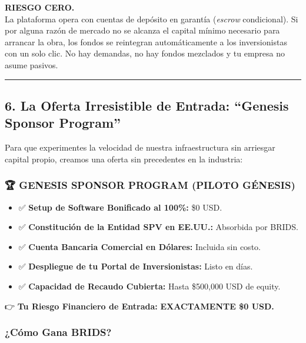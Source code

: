 \documentclass[
]{article}
\providecommand{\tightlist}{%
  \setlength{\itemsep}{0pt}\setlength{\parskip}{0pt}}
\renewenvironment{quote}{%
  \vspace{0.4em}
  \begin{tcolorbox}[
    colback=bridsLight,
    colframe=bridsBlue,
    arc=2mm,
    boxrule=1.2pt,
    left=10pt,
    right=10pt,
    top=8pt,
    bottom=8pt,
    before skip=6pt,
    after skip=8pt
  ]%
}{%
  \end{tcolorbox}%
}
\begin{document}
\begin{quote}
\textbf{RIESGO CERO.}\\
La plataforma opera con cuentas de depósito en garantía (\emph{escrow}
condicional). Si por alguna razón de mercado no se alcanza el capital
mínimo necesario para arrancar la obra, los fondos se reintegran
automáticamente a los inversionistas con un solo clic. No hay demandas,
no hay fondos mezclados y tu empresa no asume pasivos.
\end{quote}

\begin{center}\rule{0.5\linewidth}{0.5pt}\end{center}

\subsection{6. La Oferta Irresistible de Entrada: ``Genesis Sponsor
Program''}\label{la-oferta-irresistible-de-entrada-genesis-sponsor-program}

Para que experimentes la velocidad de nuestra infraestructura sin
arriesgar capital propio, creamos una oferta sin precedentes en la
industria:

\begin{quote}
\mbox{}%
\subsubsection{🏆 GENESIS SPONSOR PROGRAM (PILOTO
GÉNESIS)}\label{genesis-sponsor-program-piloto-guxe9nesis}

\begin{itemize}
\tightlist
\item
  ✅ \textbf{Setup de Software Bonificado al 100\%:} \$0 USD.
\item
  ✅ \textbf{Constitución de la Entidad SPV en EE.UU.:} Absorbida por
  BRIDS.
\item
  ✅ \textbf{Cuenta Bancaria Comercial en Dólares:} Incluida sin costo.
\item
  ✅ \textbf{Despliegue de tu Portal de Inversionistas:} Listo en días.
\item
  ✅ \textbf{Capacidad de Recaudo Cubierta:} Hasta \$500,000 USD de
  equity.
\end{itemize}

👉 \textbf{Tu Riesgo Financiero de Entrada:} \textbf{EXACTAMENTE \$0
USD.}
\end{quote}

\subsubsection{¿Cómo Gana BRIDS?}\label{cuxf3mo-gana-brids}
\end{document}
